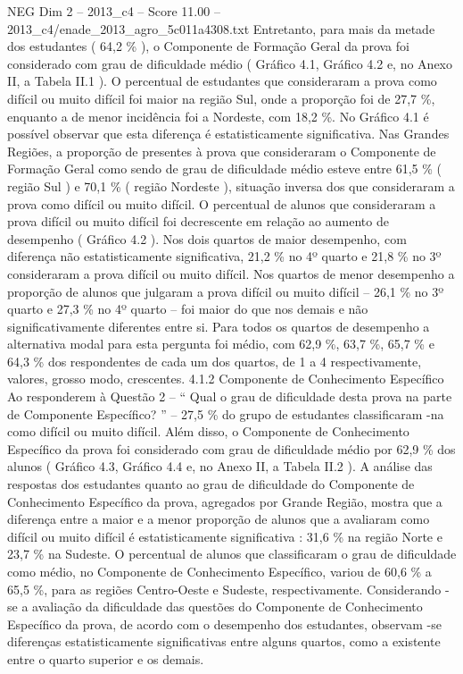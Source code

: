 \begin{textsample}{NEG Dim 2 – 2013\_c4 – Score 11.00 – 2013\_c4/enade\_2013\_agro\_5c011a4308.txt}
Entretanto, para mais da metade dos estudantes ( 64,2 \% ), o Componente de Formação Geral da prova foi considerado com grau de dificuldade médio ( Gráfico 4.1, Gráfico 4.2 e, no Anexo II, a Tabela II.1 ).
O percentual de estudantes que consideraram a prova como difícil ou muito difícil foi maior na região Sul, onde a proporção foi de 27,7 \%, enquanto a de menor incidência foi a Nordeste, com 18,2 \%.
No Gráfico 4.1 é possível observar que esta diferença é estatisticamente significativa.
Nas Grandes Regiões, a proporção de presentes à prova que consideraram o Componente de Formação Geral como sendo de grau de dificuldade médio esteve entre 61,5 \% ( região Sul ) e 70,1 \% ( região Nordeste ), situação inversa dos que consideraram a prova como difícil ou muito difícil.
O percentual de alunos que consideraram a prova difícil ou muito difícil foi decrescente em relação ao aumento de desempenho ( Gráfico 4.2 ).
Nos dois quartos de maior desempenho, com diferença não estatisticamente significativa, 21,2 \% no 4º quarto e 21,8 \% no 3º consideraram a prova difícil ou muito difícil.
Nos quartos de menor desempenho a proporção de alunos que julgaram a prova difícil ou muito difícil – 26,1 \% no 3º quarto e 27,3 \% no 4º quarto – foi maior do que nos demais e não significativamente diferentes entre si.
Para todos os quartos de desempenho a alternativa modal para esta pergunta foi médio, com 62,9 \%, 63,7 \%, 65,7 \% e 64,3 \% dos respondentes de cada um dos quartos, de 1 a 4 respectivamente, valores, grosso modo, crescentes. 4.1.2 Componente de Conhecimento Específico Ao responderem à Questão 2 – “ Qual o grau de dificuldade desta prova na parte de Componente Específico? ” – 27,5 \% do grupo de estudantes classificaram -na como difícil ou muito difícil.
Além disso, o Componente de Conhecimento Específico da prova foi considerado com grau de dificuldade médio por 62,9 \% dos alunos ( Gráfico 4.3, Gráfico 4.4 e, no Anexo II, a Tabela II.2 ).
A análise das respostas dos estudantes quanto ao grau de dificuldade do Componente de Conhecimento Específico da prova, agregados por Grande Região, mostra que a diferença entre a maior e a menor proporção de alunos que a avaliaram como difícil ou muito difícil é estatisticamente significativa : 31,6 \% na região Norte e 23,7 \% na Sudeste.
O percentual de alunos que classificaram o grau de dificuldade como médio, no Componente de Conhecimento Específico, variou de 60,6 \% a 65,5 \%, para as regiões Centro-Oeste e Sudeste, respectivamente.
Considerando -se a avaliação da dificuldade das questões do Componente de Conhecimento Específico da prova, de acordo com o desempenho dos estudantes, observam -se diferenças estatisticamente significativas entre alguns quartos, como a existente entre o quarto superior e os demais.

\end{textsample}

